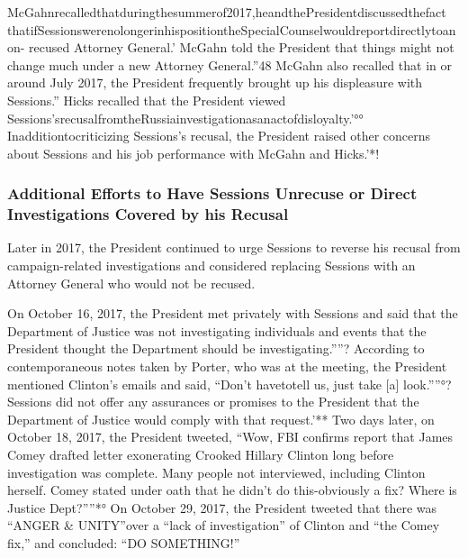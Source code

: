 McGahnrecalledthatduringthesummerof2017,heandthePresidentdiscussedthefact thatifSessionswerenolongerinhispositiontheSpecialCounselwouldreportdirectlytoanon- recused Attorney General.' McGahn told the President that things might not change much under a new Attorney General.”48 McGahn also recalled that in or around July 2017, the President frequently brought up his displeasure with Sessions.” Hicks recalled that the President viewed Sessions'srecusalfromtheRussiainvestigationasanactofdisloyalty.'°° Inadditiontocriticizing Sessions's recusal, the President raised other concerns about Sessions and his job performance with McGahn and Hicks.'*!

\subsubsection{Additional Efforts to Have Sessions Unrecuse or Direct Investigations Covered by his Recusal}

Later in 2017, the President continued to urge Sessions to reverse his recusal from campaign-related investigations and considered replacing Sessions with an Attorney General who would not be recused.

On October 16, 2017, the President met privately with Sessions and said that the Department of Justice was not investigating individuals and events that the President thought the Department should be investigating.””? According to contemporaneous notes taken by Porter, who was at the meeting, the President mentioned Clinton's emails and said, “Don't havetotell us, just take [a] look.””°? Sessions did not offer any assurances or promises to the President that the Department of Justice would comply with that request.'** Two days later, on October 18, 2017, the President tweeted, “Wow, FBI confirms report that James Comey drafted letter exonerating Crooked Hillary Clinton long before investigation was complete. Many people not interviewed,
including Clinton herself. Comey stated under oath that he didn't do this-obviously a fix? Where is Justice Dept?””*° On October 29, 2017, the President tweeted that there was “ANGER & UNITY”over a “lack of investigation” of Clinton and “the Comey fix,” and concluded: “DO SOMETHING!”

